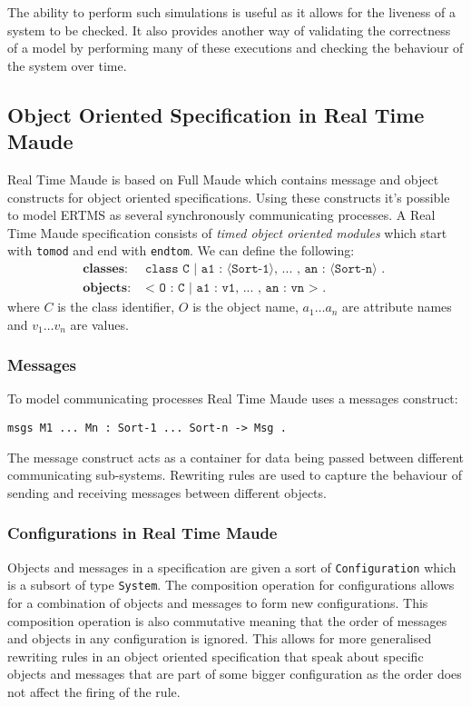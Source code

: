 The ability to perform such simulations is useful as it allows for the liveness of a system to be checked. It also provides another way of validating the correctness of a model by performing many of these executions and checking the behaviour of the system over time.

\subsection{Object Oriented Specification in Real Time Maude}
Real Time Maude is based on Full Maude which contains message and object constructs for object oriented specifications. Using these constructs it's possible to model ERTMS as several synchronously communicating processes. A Real Time Maude specification consists of  \emph{timed object oriented modules} which start with \texttt{tomod} and end with \texttt{endtom}.
\medskip
We can define the following:
\begin{align*}
\textbf{classes}: & \texttt{ class C | a1 : ⟨Sort-1⟩, ... , an : ⟨Sort-n⟩ . } \\
\textbf{objects}: & \texttt{ < O : C | a1 : v1, ... , an : vn >  . } 
\end{align*}
where $C$ is the class identifier, $O$ is the object name, $a_1 \ldots a_n$ are attribute names and $v_1 \ldots v_n$ are values. \\
\medskip
\subsubsection*{Messages}
To model communicating processes Real Time Maude uses a messages construct:
\begin{center}
\verb|msgs M1 ... Mn : Sort-1 ... Sort-n -> Msg . | 
\end{center}

The message construct acts as a container for data being passed between different communicating sub-systems. Rewriting rules are used to capture the behaviour of sending and receiving messages between different objects.

\subsubsection*{Configurations in Real Time Maude}
Objects and messages in a specification are given a sort of \texttt{Configuration} which is a subsort of type \texttt{System}. The composition operation for configurations allows for a combination of objects and messages to form new configurations. This composition operation is also commutative meaning that the order of messages and objects in any configuration is ignored. This allows for more generalised rewriting rules in an object oriented specification that speak about specific objects and messages that are part of some bigger configuration as the order does not affect the firing of the rule.

